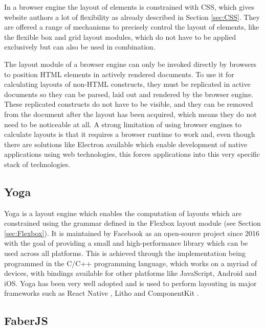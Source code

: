 In a browser engine the layout of elements is constrained with CSS, which gives website authors a lot of flexibility as already described in Section \ref{sec:CSS}. 
They are offered a range of mechanisms to precisely control the layout of elements, like the flexible box and grid layout modules, which do not have to be applied exclusively but can also be used in combination. 

The layout module of a browser engine can only be invoked directly by browsers to position HTML elements in actively rendered documents. 
To use it for calculating layouts of non-HTML constructs, they must be replicated in active documents so they can be parsed, laid out and rendered by the browser engine. 
These replicated constructs do not have to be visible, and they can be removed from the document after the layout has been acquired, which means they do not need to be noticeable at all. 
A strong limitation of using browser engines to calculate layouts is that it requires a browser runtime to work and, even though there are solutions like Electron available which enable development of native applications using web technologies, this forces applications into this very specific stack of technologies. 

\subsection{Yoga}
\label{sec:Yoga}

Yoga \parencite{Yoga} is a layout engine which enables the computation of layouts which are constrained using the grammar defined in the Flexbox layout module (see Section \ref{sec:Flexbox}). 
It is maintained by Facebook as an open-source project since 2016 \parencite{YogaRelease} with the goal of providing a small and high-performance library which can be used across all platforms. 
This is achieved through the implementation being programmed in the C/C++ programming language, which works on a myriad of devices, with bindings available for other platforms like JavaScript, Android and iOS.
Yoga has been very well adopted and is used to perform layouting in major frameworks such as React Native \parencite{ReactNative}, Litho \parencite{Litho} and ComponentKit \parencite{ComponentKit}.

\subsection{FaberJS}
\label{sec:FaberJS}

